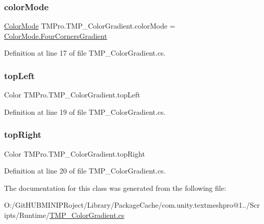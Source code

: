 \mbox{\label{class_t_m_pro_1_1_t_m_p___color_gradient_ae4b077f3e706fd554da95fe79eeb7a33}} 
\subsubsection{\texorpdfstring{colorMode}{colorMode}}
{\footnotesize\ttfamily \mbox{\hyperlink{namespace_t_m_pro_ad6c4f3ea250d747999f28f1f7678c4b3}{Color\+Mode}} T\+M\+Pro.\+T\+M\+P\+\_\+\+Color\+Gradient.\+color\+Mode = \mbox{\hyperlink{namespace_t_m_pro_ad6c4f3ea250d747999f28f1f7678c4b3a67770dd4dc1eec40719e9e72336f234a}{Color\+Mode.\+Four\+Corners\+Gradient}}}



Definition at line 17 of file T\+M\+P\+\_\+\+Color\+Gradient.\+cs.

\mbox{\label{class_t_m_pro_1_1_t_m_p___color_gradient_add761a25f601b2bc256bbfd5508273e6}} 
\subsubsection{\texorpdfstring{topLeft}{topLeft}}
{\footnotesize\ttfamily Color T\+M\+Pro.\+T\+M\+P\+\_\+\+Color\+Gradient.\+top\+Left}



Definition at line 19 of file T\+M\+P\+\_\+\+Color\+Gradient.\+cs.

\mbox{\label{class_t_m_pro_1_1_t_m_p___color_gradient_a1d43c017959ce5b0fb38a2db7b4ed8a7}} 
\subsubsection{\texorpdfstring{topRight}{topRight}}
{\footnotesize\ttfamily Color T\+M\+Pro.\+T\+M\+P\+\_\+\+Color\+Gradient.\+top\+Right}



Definition at line 20 of file T\+M\+P\+\_\+\+Color\+Gradient.\+cs.



The documentation for this class was generated from the following file\+:\begin{DoxyCompactItemize}
\item 
O\+:/\+Git\+H\+U\+B\+M\+I\+N\+I\+P\+Roject/\+Library/\+Package\+Cache/com.\+unity.\+textmeshpro@1../\+Scripts/\+Runtime/\mbox{\hyperlink{_t_m_p___color_gradient_8cs}{T\+M\+P\+\_\+\+Color\+Gradient.\+cs}}\end{DoxyCompactItemize}
